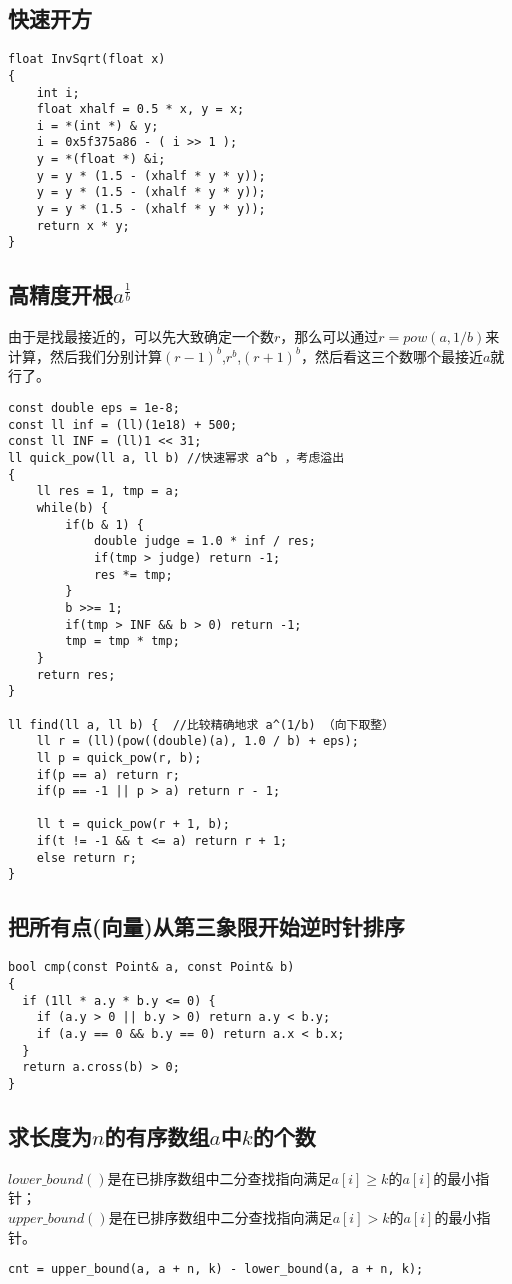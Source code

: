 \subsection{快速开方}
\begin{lstlisting}
float InvSqrt(float x)
{
	int i;
	float xhalf = 0.5 * x, y = x;
	i = *(int *) & y;
	i = 0x5f375a86 - ( i >> 1 );
	y = *(float *) &i;
	y = y * (1.5 - (xhalf * y * y));
	y = y * (1.5 - (xhalf * y * y));  	
	y = y * (1.5 - (xhalf * y * y));
	return x * y;
}
\end{lstlisting}

\subsection{高精度开根$a^{\frac{1}{b}}$}
由于是找最接近的，可以先大致确定一个数$r$，那么可以通过$r=pow(a,1/b)$来计算，然后我们分别计算$(r-1)^b$,$r^b$,$(r+1)^b$，然后看这三个数哪个最接近$a$就行了。

\begin{lstlisting}
const double eps = 1e-8;
const ll inf = (ll)(1e18) + 500;
const ll INF = (ll)1 << 31;
ll quick_pow(ll a, ll b) //快速幂求 a^b ，考虑溢出
{
    ll res = 1, tmp = a;
    while(b) {
        if(b & 1) {
            double judge = 1.0 * inf / res;
            if(tmp > judge) return -1;
            res *= tmp;
        }
        b >>= 1;
        if(tmp > INF && b > 0) return -1;
        tmp = tmp * tmp;
    }
    return res;
}

ll find(ll a, ll b) {  //比较精确地求 a^(1/b) （向下取整）
    ll r = (ll)(pow((double)(a), 1.0 / b) + eps);
    ll p = quick_pow(r, b);
    if(p == a) return r;
    if(p == -1 || p > a) return r - 1;

    ll t = quick_pow(r + 1, b);
    if(t != -1 && t <= a) return r + 1;
    else return r;
}
\end{lstlisting}

\subsection{把所有点(向量)从第三象限开始逆时针排序}
\begin{lstlisting}
bool cmp(const Point& a, const Point& b)
{
  if (1ll * a.y * b.y <= 0) {
    if (a.y > 0 || b.y > 0) return a.y < b.y;
    if (a.y == 0 && b.y == 0) return a.x < b.x;
  }
  return a.cross(b) > 0;
}
\end{lstlisting}

\subsection{求长度为$n$的有序数组$a$中$k$的个数}
$lower\_bound()$是在已排序数组中二分查找指向满足$a[i] \geq k$的$a[i]$的最小指针； \\
$upper\_bound()$是在已排序数组中二分查找指向满足$a[i] > k $的$a[i]$的最小指针。
\begin{lstlisting}
cnt = upper_bound(a, a + n, k) - lower_bound(a, a + n, k);
\end{lstlisting}

